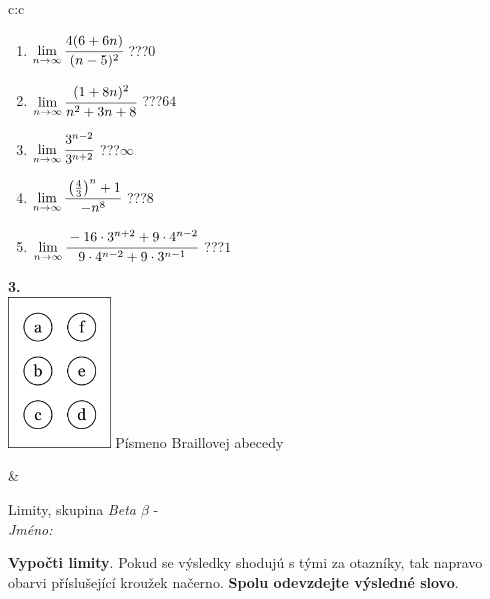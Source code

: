 \documentclass[10pt]{report}
\begin{document}
\begin{tabular}{c:c}
\begin{minipage}[c][104.5mm][t]{0.5\linewidth}
\begin{center}
\begin{minipage}{0.79\linewidth}
\begin{center}
\begin{varwidth}{\linewidth}
\begin{enumerate}
\item $\lim\limits_{n\to\infty}\cfrac{4(6+6n)}{(n-5)^2}$\quad \dotfill\; ???\;\dotfill \quad $0$
\item $\lim\limits_{n\to\infty}\cfrac{(1+8n)^2}{n^2+3n+8}$\quad \dotfill\; ???\;\dotfill \quad $64$
\item $\lim\limits_{n\to\infty}\cfrac{3^{n-2}}{3^{n+2}}$\quad \dotfill\; ???\;\dotfill \quad $\infty$
\item $\lim\limits_{n\to\infty}\cfrac{\left(\frac{4}{3}\right)^n +1}{-n^{8}}$\quad \dotfill\; ???\;\dotfill \quad $8$
\item $\lim\limits_{n\to\infty}\cfrac{-16\cdot 3^{n+2}+9\cdot 4^{n-2}}{9\cdot 4^{n-2}+9\cdot 3^{n-1}}$\quad \dotfill\; ???\;\dotfill \quad $1$
\end{enumerate}
\end{varwidth}
\end{center}
\end{minipage}
\begin{minipage}{0.20\linewidth}
\begin{center}
{\Huge\bfseries 3.} \\[2mm]
\includegraphics[height=40mm]{../images/braille.png}
{\small Písmeno Braillovej abecedy}
\end{center}
\end{minipage}
\end{center}
\end{minipage}
&
\begin{minipage}[c][104.5mm][t]{0.5\linewidth}
\begin{center}
\vspace{7mm}
{\huge Limity, skupina \textit{Beta $\beta$} -}\\[5mm]
\textit{Jméno:}\phantom{xxxxxxxxxxxxxxxxxxxxxxxxxxxxxxxxxxxxxxxxxxxxxxxxxxxxxxxxxxxxxxxxx}\\[5mm]
\begin{minipage}{0.95\linewidth}
\begin{center}
\textbf{Vypočti limity}. Pokud se výsledky shodujú s tými za otazníky, tak napravo\\obarvi příslušející kroužek načerno. \textbf{Spolu odevzdejte výsledné slovo}.

\end{center}
\end{minipage}
\end{center}
\end{minipage}
\end{tabular}
\end{document}
